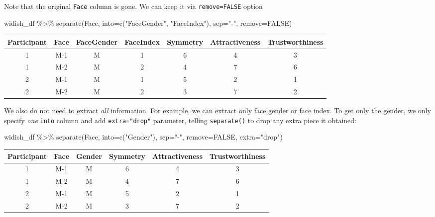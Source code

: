 \documentclass[
]{book}
\newenvironment{Shaded}{\begin{snugshade}}{\end{snugshade}}
\newcommand{\AttributeTok}[1]{\textcolor[rgb]{0.77,0.63,0.00}{#1}}
\newcommand{\ConstantTok}[1]{\textcolor[rgb]{0.00,0.00,0.00}{#1}}
\newcommand{\FunctionTok}[1]{\textcolor[rgb]{0.00,0.00,0.00}{#1}}
\newcommand{\NormalTok}[1]{#1}
\newcommand{\SpecialCharTok}[1]{\textcolor[rgb]{0.00,0.00,0.00}{#1}}
\newcommand{\StringTok}[1]{\textcolor[rgb]{0.31,0.60,0.02}{#1}}
\begin{document}
Note that the original \texttt{Face} column is gone. We can keep it via \texttt{remove=FALSE} option

\begin{Shaded}
\begin{Highlighting}[]
\NormalTok{widish\_df }\SpecialCharTok{\%\textgreater{}\%}
  \FunctionTok{separate}\NormalTok{(Face, }\AttributeTok{into=}\FunctionTok{c}\NormalTok{(}\StringTok{"FaceGender"}\NormalTok{, }\StringTok{"FaceIndex"}\NormalTok{), }\AttributeTok{sep=}\StringTok{"{-}"}\NormalTok{, }\AttributeTok{remove=}\ConstantTok{FALSE}\NormalTok{)}
\end{Highlighting}
\end{Shaded}

\begin{tabular}{c|c|c|c|c|c|c}
\hline
Participant & Face & FaceGender & FaceIndex & Symmetry & Attractiveness & Trustworthiness\\
\hline
1 & M-1 & M & 1 & 6 & 4 & 3\\
\hline
1 & M-2 & M & 2 & 4 & 7 & 6\\
\hline
2 & M-1 & M & 1 & 5 & 2 & 1\\
\hline
2 & M-2 & M & 2 & 3 & 7 & 2\\
\hline
\end{tabular}

We also do not need to extract \emph{all} information. For example, we can extract only face gender or face index. To get only the gender, we only specify \emph{one} \texttt{into} column and add \texttt{extra="drop"} parameter, telling \texttt{separate()} to drop any extra piece it obtained:

\begin{Shaded}
\begin{Highlighting}[]
\NormalTok{widish\_df }\SpecialCharTok{\%\textgreater{}\%}
  \FunctionTok{separate}\NormalTok{(Face, }\AttributeTok{into=}\FunctionTok{c}\NormalTok{(}\StringTok{"Gender"}\NormalTok{), }\AttributeTok{sep=}\StringTok{"{-}"}\NormalTok{, }\AttributeTok{remove=}\ConstantTok{FALSE}\NormalTok{, }\AttributeTok{extra=}\StringTok{"drop"}\NormalTok{)}
\end{Highlighting}
\end{Shaded}

\begin{tabular}{c|c|c|c|c|c}
\hline
Participant & Face & Gender & Symmetry & Attractiveness & Trustworthiness\\
\hline
1 & M-1 & M & 6 & 4 & 3\\
\hline
1 & M-2 & M & 4 & 7 & 6\\
\hline
2 & M-1 & M & 5 & 2 & 1\\
\hline
2 & M-2 & M & 3 & 7 & 2\\
\hline
\end{tabular}
\end{document}
